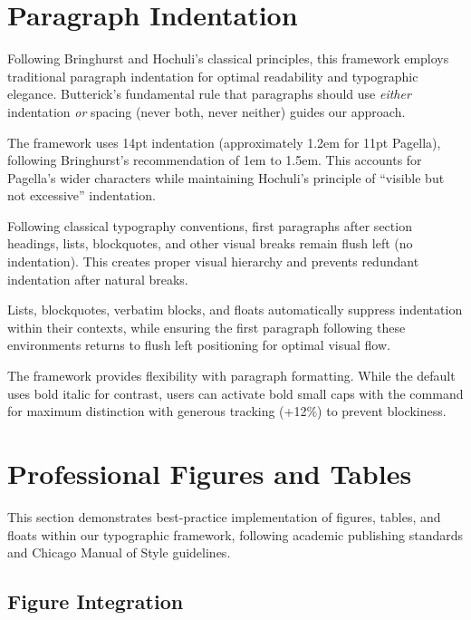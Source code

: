\documentclass[11pt]{article}
\begin{document}
\section{Paragraph Indentation}

Following Bringhurst and Hochuli's classical principles, this framework employs traditional paragraph indentation for optimal readability and typographic elegance. Butterick's fundamental rule that paragraphs should use \emph{either} indentation \emph{or} spacing (never both, never neither) guides our approach.

 The framework uses 14pt indentation (approximately 1.2em for 11pt Pagella), following Bringhurst's recommendation of 1em to 1.5em. This accounts for Pagella's wider characters while maintaining Hochuli's principle of ``visible but not excessive'' indentation.

 Following classical typography conventions, first paragraphs after section headings, lists, blockquotes, and other visual breaks remain flush left (no indentation). This creates proper visual hierarchy and prevents redundant indentation after natural breaks.

 Lists, blockquotes, verbatim blocks, and floats automatically suppress indentation within their contexts, while ensuring the first paragraph following these environments returns to flush left positioning for optimal visual flow.

 The framework provides flexibility with paragraph formatting. While the default uses bold italic for contrast, users can activate bold small caps with the  command for maximum distinction with generous tracking (+12\%) to prevent blockiness.

\section{Professional Figures and Tables}

This section demonstrates best-practice implementation of figures, tables, and floats within our typographic framework, following academic publishing standards and Chicago Manual of Style guidelines.

\subsection{Figure Integration}
\end{document}
